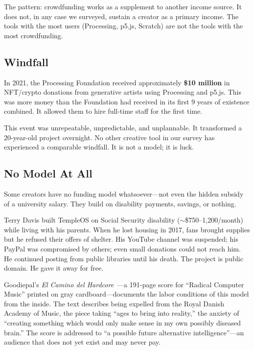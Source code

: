 \documentclass[10pt,letterpaper,twocolumn]{article}
\begin{document}
The pattern: crowdfunding works as a supplement to another income source. It does not, in any case we surveyed, sustain a creator as a primary income. The tools with the most users (Processing, p5.js, Scratch) are not the tools with the most crowdfunding.

\subsection{Windfall}

In 2021, the Processing Foundation received approximately \textbf{\$10 million} in NFT/crypto donations from generative artists using Processing and p5.js. This was more money than the Foundation had received in its first 9 years of existence combined. It allowed them to hire full-time staff for the first time.

This event was unrepeatable, unpredictable, and unplannable. It transformed a 20-year-old project overnight. No other creative tool in our survey has experienced a comparable windfall. It is not a model; it is luck.

\subsection{No Model At All}

Some creators have no funding model whatsoever---not even the hidden subsidy of a university salary. They build on disability payments, savings, or nothing.

Terry Davis built TempleOS on Social Security disability ($\sim$\$750--1,200/month) while living with his parents. When he lost housing in 2017, fans brought supplies but he refused their offers of shelter. His YouTube channel was suspended; his PayPal was compromised by others; even small donations could not reach him. He continued posting from public libraries until his death. The project is public domain. He gave it away for free.

Goodiepal's \emph{El Camino del Hardcore}~\citep{goodiepal2012elcamino}---a 191-page score for ``Radical Computer Music'' printed on gray cardboard---documents the labor conditions of this model from the inside. The text describes being expelled from the Royal Danish Academy of Music, the piece taking ``ages to bring into reality,'' the anxiety of ``creating something which would only make sense in my own possibly diseased brain.'' The score is addressed to ``a possible future alternative intelligence''---an audience that does not yet exist and may never pay.
\end{document}
